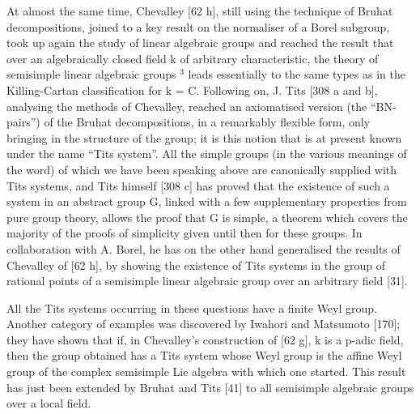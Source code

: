 At almost the same time, Chevalley {[}62 h{]}, still using the technique of Bruhat decompositions, joined to a key result on the normaliser of a Borel subgroup, took up again the study of linear algebraic groups and reached the result that over an algebraically closed field k of arbitrary characteristic, the theory of semisimple linear algebraic groups \(^{3}\) leads essentially to the same types as in the Killing-Cartan classification for k = C. Following on, J. Tits {[}308 a and b{]}, analysing the methods of Chevalley, reached an axiomatised version (the ``BN-pairs'') of the Bruhat decompositions, in a remarkably flexible form, only bringing in the structure of the group; it is this notion that is at present known under the name ``Tits system''. All the simple groups (in the various meanings of the word) of which we have been speaking above are canonically supplied with Tits systems, and Tits himself {[}308 c{]} has proved that the existence of such a system in an abstract group G, linked with a few supplementary properties from pure group theory, allows the proof that G is simple, a theorem which covers the majority of the proofs of simplicity given until then for these groups. In collaboration with A. Borel, he has on the other hand generalised the results of Chevalley of {[}62 h{]}, by showing the existence of Tits systems in the group of rational points of a semisimple linear algebraic group over an arbitrary field {[}31{]}.

All the Tits systems occurring in these questions have a finite Weyl group. Another category of examples was discovered by Iwahori and Matsumoto {[}170{]}; they have shown that if, in Chevalley's construction of {[}62 g{]}, k is a p-adic field, then the group obtained has a Tits system whose Weyl group is the affine Weyl group of the complex semisimple Lie algebra with which one started. This result has just been extended by Bruhat and Tits {[}41{]} to all semisimple algebraic groups over a local field.

